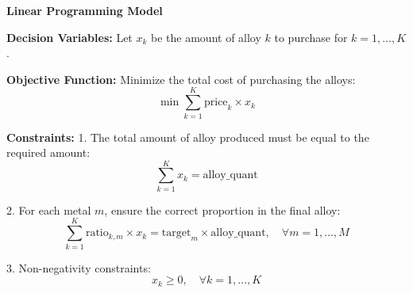 \documentclass{article}
\begin{document}
\textbf{Linear Programming Model}

\textbf{Decision Variables:}  
Let \( x_k \) be the amount of alloy \( k \) to purchase for \( k = 1, \ldots, K \).

\textbf{Objective Function:}  
Minimize the total cost of purchasing the alloys:
\[
\min \sum_{k=1}^{K} \text{price}_k \times x_k
\]

\textbf{Constraints:}  
1. The total amount of alloy produced must be equal to the required amount:
\[
\sum_{k=1}^{K} x_k = \text{alloy\_quant}
\]

2. For each metal \( m \), ensure the correct proportion in the final alloy:
\[
\sum_{k=1}^{K} \text{ratio}_{k,m} \times x_k = \text{target}_{m} \times \text{alloy\_quant}, \quad \forall m = 1, \ldots, M
\]

3. Non-negativity constraints:
\[
x_k \geq 0, \quad \forall k = 1, \ldots, K
\]
\end{document}
